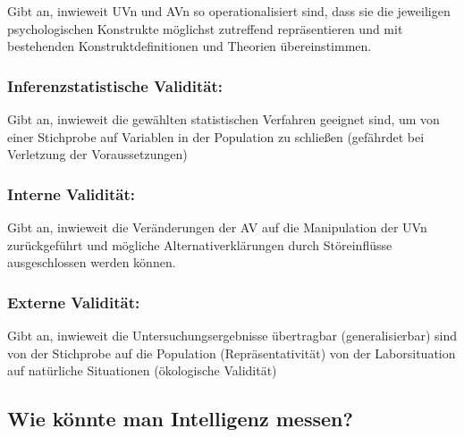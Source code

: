 \documentclass[
]{book}
\begin{document}
Gibt an, inwieweit UVn und AVn so operationalisiert sind, dass sie die jeweiligen psychologischen
Konstrukte möglichst zutreffend repräsentieren und mit bestehenden Konstruktdefinitionen und
Theorien übereinstimmen.

\hypertarget{inferenzstatistische-validituxe4t}{%
\subsubsection{Inferenzstatistische Validität:}\label{inferenzstatistische-validituxe4t}}

Gibt an, inwieweit die gewählten statistischen Verfahren geeignet sind, um von einer Stichprobe
auf Variablen in der Population zu schließen (gefährdet bei Verletzung der Voraussetzungen)

\hypertarget{interne-validituxe4t}{%
\subsubsection{Interne Validität:}\label{interne-validituxe4t}}

Gibt an, inwieweit die Veränderungen der AV auf die Manipulation der UVn zurückgeführt und
mögliche Alternativerklärungen durch Störeinflüsse ausgeschlossen werden können.

\hypertarget{externe-validituxe4t}{%
\subsubsection{Externe Validität:}\label{externe-validituxe4t}}

Gibt an, inwieweit die Untersuchungsergebnisse übertragbar (generalisierbar) sind
von der Stichprobe auf die Population (Repräsentativität)
von der Laborsituation auf natürliche Situationen (ökologische Validität)

\hypertarget{wie-kuxf6nnte-man-intelligenz-messen}{%
\subsection{Wie könnte man Intelligenz messen?}\label{wie-kuxf6nnte-man-intelligenz-messen}}
\end{document}

